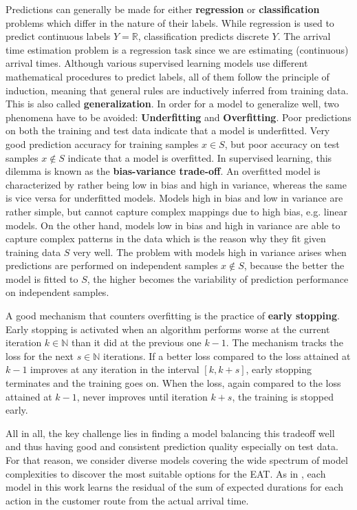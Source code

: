 Predictions can generally be made for either \textbf{regression} or \textbf{classification} problems which differ in the nature of their labels. 
While regression is used to predict continuous labels $ Y = \mathbb{R} $, classification predicts discrete $ Y $. The arrival time estimation problem is a regression task since we are estimating (continuous) arrival times.
Although various supervised learning models use different mathematical procedures to predict labels, all of them follow the principle of induction, meaning that general rules are inductively inferred from training data. This is also called \textbf{generalization}.  
In order for a model to generalize well, two phenomena have to be avoided: \textbf{Underfitting} and \textbf{Overfitting}. 
Poor predictions on both the training and test data indicate that a model is underfitted. Very good prediction accuracy for training samples $ x \in S $, but poor accuracy on test samples $ x \notin S $ indicate that a model is overfitted.
In supervised learning, this dilemma is known as the \textbf{bias-variance trade-off}. 
An overfitted model is characterized by rather being low in bias and high in variance, whereas the same is vice versa for underfitted models. Models high in bias and low in variance are rather simple, but cannot capture complex mappings due to high bias, e.g. linear models. On the other hand, models low in bias and high in variance are able to capture complex patterns in the data which is the reason why they fit given training data $ S $ very well. The problem with models high in variance arises when predictions are performed on independent samples $ x \notin S $, because the better the model is fitted to $ S $, the higher becomes the variability of prediction performance on independent samples. 

A good mechanism that counters overfitting is the practice of \textbf{early stopping}. Early stopping is activated when an algorithm performs worse at the current iteration $ k \in \mathbb{N} $ than it did at the previous one $ k-1 $. The mechanism tracks the loss for the next $ s \in \mathbb{N} $ iterations. If a better loss compared to the loss attained at $ k-1 $ improves at any iteration in the interval $ [k, k+s] $, early stopping terminates and the training goes on. When the loss, again compared to the loss attained at $ k-1 $, never improves until iteration $ k+s $, the training is stopped early.
 
All in all, the key challenge lies in finding a model balancing this tradeoff well and thus having good and consistent prediction quality especially on test data. For that reason, we consider diverse models covering the wide spectrum of model complexities to discover the most suitable options for the EAT. As in \cite{Hildebrandt2020_EAT}, each model in this work learns the residual of the sum of expected durations for each action in the customer route from the actual arrival time.
 
